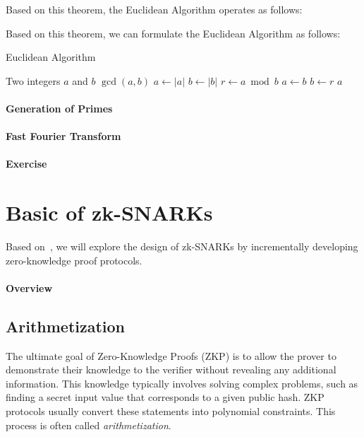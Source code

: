 \documentclass{article}
\begin{document}
Based on this theorem, the Euclidean Algorithm operates as follows:

Based on this theorem, we can formulate the Euclidean Algorithm as follows:
\begin{algorithm}
\caption{Euclidean Algorithm}\label{alg:euclidean}
\begin{algorithmic}
\Require Two integers $a$ and $b$
\Ensure $\gcd(a, b)$
\State $a \gets |a|$
\State $b \gets |b|$
    \State $r \gets a \bmod b$
    \State $a \gets b$
    \State $b \gets r$
\EndWhile
\State \Return $a$ 
\end{algorithmic}
\end{algorithm}

\paragraph{Generation of Primes}

\paragraph{Fast Fourier Transform}

\paragraph{Exercise}

\section{Basic of zk-SNARKs}

Based on~\cite{petkus2019and}, we will explore the design of zk-SNARKs by incrementally developing zero-knowledge proof protocols.

\paragraph{Overview}

\subsection{Arithmetization}

The ultimate goal of Zero-Knowledge Proofs (ZKP) is to allow the prover to demonstrate their knowledge to the verifier without revealing any additional information. This knowledge typically involves solving complex problems, such as finding a secret input value that corresponds to a given public hash. ZKP protocols usually convert these statements into polynomial constraints. This process is often called \textit{arithmetization}.
\end{document}
